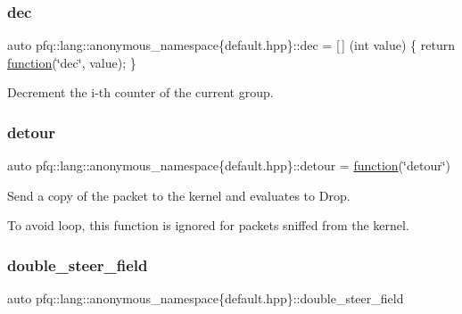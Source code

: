 \subsubsection{\texorpdfstring{dec}{dec}}
{\footnotesize\ttfamily auto pfq\+::lang\+::anonymous\+\_\+namespace\{default.\+hpp\}\+::dec = \mbox{[}$\,$\mbox{]} (int value) \{ return \hyperlink{namespacepfq_1_1lang_a1a4638059d700ae08d0ca63886ff2bb3}{function}(\char`\"{}dec\char`\"{}, value); \}}



Decrement the i-\/th counter of the current group. 

\mbox{\label{namespacepfq_1_1lang_1_1anonymous__namespace_02default_8hpp_03_ac8ba4f5ff06c1e099ac888ba4faa697a}} 
\subsubsection{\texorpdfstring{detour}{detour}}
{\footnotesize\ttfamily auto pfq\+::lang\+::anonymous\+\_\+namespace\{default.\+hpp\}\+::detour = \hyperlink{namespacepfq_1_1lang_a1a4638059d700ae08d0ca63886ff2bb3}{function}(\char`\"{}detour\char`\"{})}



Send a copy of the packet to the kernel and evaluates to {\ttfamily Drop}. 

To avoid loop, this function is ignored for packets sniffed from the kernel. \mbox{\label{namespacepfq_1_1lang_1_1anonymous__namespace_02default_8hpp_03_a7dc3ed59d8c7f4ff200e220a732cebdd}} 
\subsubsection{\texorpdfstring{double\+\_\+steer\+\_\+field}{double\_steer\_field}}
{\footnotesize\ttfamily auto pfq\+::lang\+::anonymous\+\_\+namespace\{default.\+hpp\}\+::double\+\_\+steer\+\_\+field}

